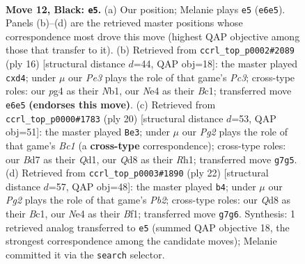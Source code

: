 \documentclass[11pt]{article}
\begin{document}
\clearpage

\begin{figure}[p]\centering
\begin{subfigure}{0.46\textwidth}\centering
\resizebox{\linewidth}{!}{%
\newchessgame
\chessboard[
  setfen={r2qkb1r/pp1b2pp/4pp2/7P/P1PNn1P1/8/1P3P2/R1BQKB1R b KQkq - 0 12},
  showmover=false,
  pgfstyle=straightmove, color=movearrow, markmove={e6-e5}
]}
\caption{}
\end{subfigure}\hfill
\begin{subfigure}{0.46\textwidth}\centering
\resizebox{\linewidth}{!}{%
\newchessgame
\chessboard[
  setfen={r1bqkbnr/p5pp/2p1p3/3p4/3p4/2P5/PP2BPPP/RNBQK2R w KQkq - 0 9},
  showmover=false,
  pgfstyle=straightmove, color=movearrow, markmove={c3-d4}
]}
\caption{}
\end{subfigure}
\\[4pt]
\begin{subfigure}{0.46\textwidth}\centering
\resizebox{\linewidth}{!}{%
\newchessgame
\chessboard[
  setfen={rn1qk2r/pp2bppp/3p4/1N1Ppb2/P7/8/1PP1BPPP/R1BQK2R w KQkq - 3 11},
  showmover=false,
  pgfstyle=straightmove, color=movearrow, markmove={c1-e3}
]}
\caption{}
\end{subfigure}\hfill
\begin{subfigure}{0.46\textwidth}\centering
\resizebox{\linewidth}{!}{%
\newchessgame
\chessboard[
  setfen={r1b1k2r/1pqp1ppp/p7/2bpP3/P4P2/8/1PPQ2PP/R1B1KB1R w KQkq - 0 12},
  showmover=false,
  pgfstyle=straightmove, color=movearrow, markmove={b2-b4}
]}
\caption{}
\end{subfigure}
\caption{\textbf{Move 12, Black: \texttt{e5}.} (a) Our position; Melanie plays \texttt{e5} (\texttt{e6e5}). Panels (b)--(d) are the retrieved master positions whose correspondence most drove this move (highest QAP objective among those that transfer to it). (b) Retrieved from \texttt{ccrl\_top\_p0002\#2089} (ply 16) [structural distance $d$=44, QAP obj=18]: the master played \texttt{cxd4}; under $\mu$ our \emph{Pe3} plays the role of that game's \emph{Pc3}; cross-type roles: our \emph{p}g4 as their \emph{N}b1, our \emph{N}e4 as their \emph{B}c1; transferred move \texttt{e6e5} \textbf{(endorses this move)}. (c) Retrieved from \texttt{ccrl\_top\_p0000\#1783} (ply 20) [structural distance $d$=53, QAP obj=51]: the master played \texttt{Be3}; under $\mu$ our \emph{Pg2} plays the role of that game's \emph{Bc1} (a \textbf{cross-type} correspondence); cross-type roles: our \emph{B}d7 as their \emph{Q}d1, our \emph{Q}d8 as their \emph{R}h1; transferred move \texttt{g7g5}. (d) Retrieved from \texttt{ccrl\_top\_p0003\#1890} (ply 22) [structural distance $d$=57, QAP obj=48]: the master played \texttt{b4}; under $\mu$ our \emph{Pg2} plays the role of that game's \emph{Pb2}; cross-type roles: our \emph{Q}d8 as their \emph{B}c1, our \emph{N}e4 as their \emph{B}f1; transferred move \texttt{g7g6}. Synthesis: 1 retrieved analog transferred to \texttt{e5} (summed QAP objective 18, the strongest correspondence among the candidate moves); Melanie committed it via the \texttt{search} selector.}
\label{fig:thought-m23}
\end{figure}
\end{document}

